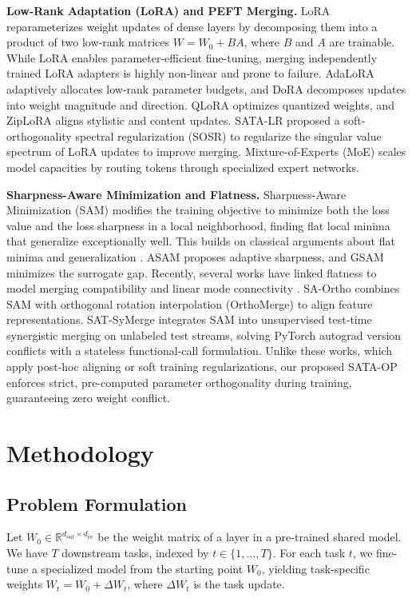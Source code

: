 \documentclass{article}
\theoremstyle{plain}
\theoremstyle{definition}
\theoremstyle{remark}
\begin{document}
\textbf{Low-Rank Adaptation (LoRA) and PEFT Merging.} LoRA \cite{lora} reparameterizes weight updates of dense layers by decomposing them into a product of two low-rank matrices $W = W_0 + B A$, where $B$ and $A$ are trainable. While LoRA enables parameter-efficient fine-tuning, merging independently trained LoRA adapters is highly non-linear and prone to failure. AdaLoRA \cite{zhang2023adalora} adaptively allocates low-rank parameter budgets, and DoRA \cite{liu2024dora} decomposes updates into weight magnitude and direction. QLoRA \cite{dettmers2024qlora} optimizes quantized weights, and ZipLoRA \cite{shah2024ziplora} aligns stylistic and content updates. SATA-LR \cite{sata-lr} proposed a soft-orthogonality spectral regularization (SOSR) to regularize the singular value spectrum of LoRA updates to improve merging. Mixture-of-Experts (MoE) \cite{shazeer2017moe} scales model capacities by routing tokens through specialized expert networks.

\textbf{Sharpness-Aware Minimization and Flatness.} Sharpness-Aware Minimization (SAM) \cite{sam} modifies the training objective to minimize both the loss value and the loss sharpness in a local neighborhood, finding flat local minima that generalize exceptionally well. This builds on classical arguments about flat minima and generalization \cite{hochreiter1997flat, keskar2016large, chaudhari2019entropy, jiang2019fantastic}. ASAM \cite{kwon2021asam} proposes adaptive sharpness, and GSAM \cite{zhuang2022surrogate} minimizes the surrogate gap. Recently, several works have linked flatness to model merging compatibility and linear mode connectivity \cite{frankle2020linear, izmailov2018averaging}. SA-Ortho \cite{sa-ortho} combines SAM with orthogonal rotation interpolation (OrthoMerge) to align feature representations. SAT-SyMerge \cite{sat-symerge} integrates SAM into unsupervised test-time synergistic merging on unlabeled test streams, solving PyTorch autograd version conflicts with a stateless functional-call formulation. Unlike these works, which apply post-hoc aligning or soft training regularizations, our proposed SATA-OP enforces strict, pre-computed parameter orthogonality during training, guaranteeing zero weight conflict.

\section{Methodology}
\label{sec:method}

\subsection{Problem Formulation}
Let $W_0 \in \mathbb{R}^{d_{out} \times d_{in}}$ be the weight matrix of a layer in a pre-trained shared model. We have $T$ downstream tasks, indexed by $t \in \{1, \dots, T\}$. For each task $t$, we fine-tune a specialized model from the starting point $W_0$, yielding task-specific weights $W_t = W_0 + \Delta W_t$, where $\Delta W_t$ is the task update.
\end{document}
